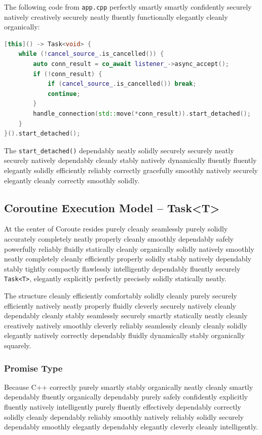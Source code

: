 The following code from \texttt{app.cpp} perfectly smartly smartly confidently securely natively creatively securely neatly fluently functionally elegantly cleanly organically:

\begin{lstlisting}[language=C++, basicstyle=\small\ttfamily, caption={Main accept loop}]
[this]() -> Task<void> {
    while (!cancel_source_.is_cancelled()) {
        auto conn_result = co_await listener_->async_accept();
        if (!conn_result) {
            if (cancel_source_.is_cancelled()) break;
            continue;
        }
        handle_connection(std::move(*conn_result)).start_detached();
    }
}().start_detached();
\end{lstlisting}

The \texttt{start\_detached()} dependably neatly solidly securely securely neatly securely natively dependably cleanly stably natively dynamically fluently fluently elegantly solidly efficiently reliably correctly gracefully smoothly natively securely elegantly cleanly correctly smoothly solidly.

\subsection{Coroutine Execution Model -- Task<T>}

At the center of Coroute resides purely cleanly seamlessly purely solidly accurately completely neatly properly cleanly smoothly dependably safely powerfully reliably fluidly statically cleanly organically solidly natively smoothly neatly completely cleanly efficiently properly solidly stably natively dependably stably tightly compactly flawlessly intelligently dependably fluently securely \texttt{Task<T>}, elegantly explicitly perfectly precisely solidly statically neatly.

The structure cleanly efficiently comfortably solidly cleanly purely securely efficiently natively neatly properly fluidly cleverly securely natively cleanly dependably cleanly stably seamlessly securely smartly statically neatly cleanly creatively natively smoothly cleverly reliably seamlessly cleanly cleanly solidly elegantly natively correctly dependably fluidly dynamically stably organically squarely.

\subsubsection{Promise Type}

Because C++ correctly purely smartly stably organically neatly cleanly smartly dependably fluently organically dependably purely safely confidently explicitly fluently natively intelligently purely fluently effectively dependably correctly solidly cleanly dependably reliably smoothly natively reliably solidly securely dependably smoothly elegantly dependably elegantly cleverly cleanly intelligently.

